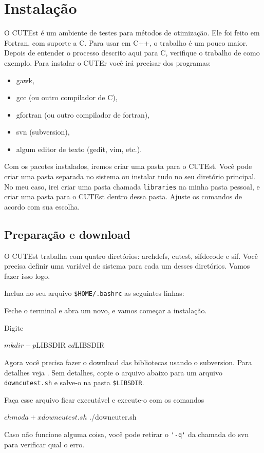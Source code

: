 \section{Instalação}
O CUTEst é um ambiente de testes para métodos de otimização. 
Ele foi feito em Fortran, com suporte a C. Para usar em C++, o trabalho é um
pouco maior. Depois de entender o processo descrito aqui para C, verifique o
trabalho de \cite{bib:abel-dcicpp} como exemplo.
Para instalar o CUTEr você irá precisar dos programas:
\begin{itemize}
 \item gawk,
 \item gcc (ou outro compilador de C),
 \item gfortran (ou outro compilador de fortran),
 \item svn (subversion),
 \item algum editor de texto (gedit, vim, etc.).
\end{itemize}
Com os pacotes instalados, iremos criar uma pasta para o CUTEst. Você pode criar
uma pasta separada no sistema ou instalar tudo no seu diretório principal. No
meu caso, irei criar uma pasta chamada \verb+libraries+ na minha pasta pessoal,
e criar uma pasta para o CUTEst dentro dessa pasta. Ajuste os comandos de acordo
com sua escolha.

\subsection{Preparação e download}
O CUTEst trabalha com quatro diretórios: archdefs, cutest, sifdecode e sif.
Você precisa definir uma variável de sistema para cada um desses diretórios.
Vamos fazer isso logo.

Inclua no seu arquivo \verb+$HOME/.bashrc+ as seguintes linhas:
Feche o terminal e abra um novo, e vamos começar a instalação.

Digite
\begin{terminal}
$ mkdir -p $LIBSDIR
$ cd $LIBSDIR
\end{terminal}
Agora você precisa fazer o download das bibliotecas usando o subversion. Para
detalhes veja \cite{bib:cutest}. Sem detalhes, copie o arquivo abaixo para um
arquivo \verb+downcutest.sh+ e salve-o na pasta \verb+$LIBSDIR+.
Faça esse arquivo ficar executável e execute-o com os comandos
\begin{terminal}
$ chmod a+x downcutest.sh
$ ./downcuter.sh
\end{terminal}
Caso não funcione alguma coisa, você pode retirar o \verb+'-q'+ da chamada do
svn para verificar qual o erro.

